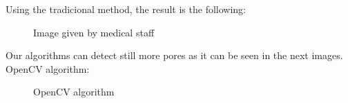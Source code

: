 Using the tradicional method, the result is the following:

    \begin{figure}[H]
      \caption{Image given by medical staff}
      \centering \setlength\fboxsep{0pt} \setlength\fboxrule{0.5pt}
    \end{figure}

Our algorithms can detect still more pores as it can be seen in the next images.\\
OpenCV algorithm:

    \begin{figure}[H]
      \caption{OpenCV algorithm}
      \centering \setlength\fboxsep{0pt} \setlength\fboxrule{0.5pt}
    \end{figure}

